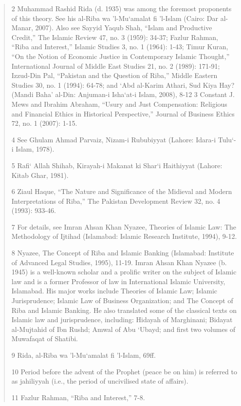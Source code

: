 \begin{quote}
2 Muhammad Rashid Rida (d. 1935) was among the foremost proponents of this theory. See his al-Riba wa 'l-Mu‘amalat fi 'l-Islam (Cairo: Dar al-Manar, 2007). Also see Sayyid Yaqub Shah, “Islam and Productive Credit,” The Islamic Review 47, no. 3 (1959): 34-37; Fazlur Rahman, “Riba and Interest,” Islamic Studies 3, no. 1 (1964): 1-43; Timur Kuran, “On the Notion of Economic Justice in Contemporary Islamic Thought,” International Journal of Middle East Studies 21, no. 2 (1989): 171-91; Izzud-Din Pal, “Pakistan and the Question of Riba,” Middle Eastern Studies 30, no. 1 (1994): 64-78; and ‘Abd al-Karim Athari, Sud Kiya Hay? (Mandi Baha' al-Din: Anjuman-i Isha‘at-i Islam, 2008), 8-12 3 Constant J. Mews and Ibrahim Abraham, “Usury and Just Compensation: Religious and Financial Ethics in Historical Perspective,” Journal of Business Ethics 72, no. 1 (2007): 1-15.

4 See Ghulam Ahmad Parvaiz, Nizam-i Rububiyyat (Lahore: Idara-i Tulu‘-i Islam, 1978).

5 Rafi‘ Allah Shihab, Kirayah-i Makanat ki Shar‘i Haithiyyat (Lahore: Kitab Ghar, 1981).

6 Ziaul Haque, “The Nature and Significance of the Midieval and Modern Interpretations of Riba,” The Pakistan Development Review 32, no. 4 (1993): 933-46.

7 For details, see Imran Ahsan Khan Nyazee, Theories of Islamic Law: The Methodology of Ijtihad (Islamabad: Islamic Research Institute, 1994), 9-12.

8 Nyazee, The Concept of Riba and Islamic Banking (Islamabad: Institute of Advanced Legal Studies, 1995), 11-19. Imran Ahsan Khan Nyazee (b. 1945) is a well-known scholar and a prolific writer on the subject of Islamic law and is a former Professor of law in International Islamic University, Islamabad. His major works include Theories of Islamic Law; Islamic Jurisprudence; Islamic Law of Business Organization; and The Concept of Riba and Islamic Banking. He also translated some of the classical texts on Islamic law and jurisprudence, including: Hidayah of Marghinani; Bidayat al-Mujtahid of Ibn Rushd; Amwal of Abu ‘Ubayd; and first two volumes of Muwafaqat of Shatibi.

9 Rida, al-Riba wa 'l-Mu‘amalat fi 'l-Islam, 69ff.

10 Period before the advent of the Prophet (peace be on him) is referred to as jahiliyyah (i.e., the period of uncivilised state of affairs).

11 Fazlur Rahman, “Riba and Interest,” 7-8.


\end{quote}
